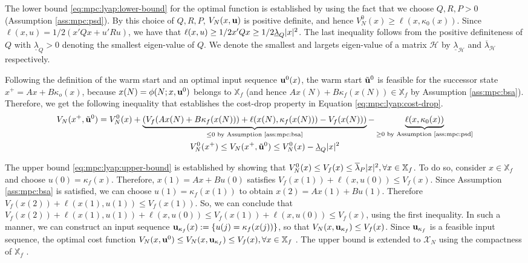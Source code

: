 The lower bound  \eqref{eq:mpc:lyap:lower-bound} for the optimal
function is established by using the 
fact that we choose $Q,R,P>0$ (Assumption \ref{ass:mpc:psd}). By this choice of $Q,R,P$, $V_N(x,\mathbf{u})$
is positive definite, and hence $V_N^0(x) \geq
\ell(x,\kappa_0(x))$. Since $\ell(x,u) = 1/2(x'Qx+u'Ru)$, we have that
$\ell(x,u) \geq 1/2x'Qx \geq 1/2\underline{\lambda}_Q\vert x \vert^2$. The last
inequality follows from the positive definiteness of $Q$ with
$\underline{\lambda}_Q >0$ denoting the smallest eigen-value of
$Q$. We denote the smallest and largets eigen-value of a matrix
$\mathcal{H}$ by $\underline{\lambda}_\mathcal{H}$ and
$\overline{\lambda}_{\mathcal{H}}$ respectively.

Following the definition of the warm start and an optimal input
sequence $\mathbf{u}^0(x)$, the warm start $\tilde{\mathbf{u}}^0$ is feasible for
the successor state $x^+ = Ax+B\kappa_o(x)$, because $x(N) = \phi(N;x,\mathbf{u}^0)$
belongs to $\mathbb{X}_f$ (and hence $Ax(N)+B\kappa_f(x(N)) \in
\mathbb{X}_f$ by Assumption \ref{ass:mpc:bsa}). Therefore, we get the
following inequality that establishes the cost-drop property in
Equation \eqref{eq:mpc:lyap:cost-drop}.
\begin{gather*}
V_N(x^+,\tilde{\mathbf{u}}^0) =
V_N^0(x)+\underbrace{\left(V_f(Ax(N)+B\kappa_f(x(N)))
+\ell(x(N),\kappa_f(x(N)))-V_f(x(N))\right)}_{\leq
  0 \text{~by Assumption \ref{ass:mpc:bsa}}} -
\underbrace{\ell(x,\kappa_0(x))}_{\geq 0 \text{~by Assumption
    \ref{ass:mpc:psd}}} \\
V_N^0(x^+) \leq V_N(x^+,\tilde{\mathbf{u}}^0)\leq  V_N^0(x)
 - \underline{\lambda}_{Q}\vert x \vert^2
\end{gather*}

The upper bound \eqref{eq:mpc:lyap:upper-bound} is established by
showing that $V_N^0(x) \leq V_f(x) 
\leq \overline{\lambda}_P\vert x \vert^2,
\forall x \in \mathbb{X}_f$. To do so, consider $x \in \mathbb{X}_f$
and choose $u(0) = \kappa_f(x)$. Therefore, $x(1) = Ax+Bu(0)$
satisfies $V_f(x(1))+\ell(x,u(0)) \leq V_f(x)$. Since Assumption
\ref{ass:mpc:bsa} is satisfied, we can choose $u(1) =
\kappa_f(x(1))$ to obtain $x(2) = Ax(1) + Bu(1)$. Therefore
$V_f(x(2))+\ell(x(1),u(1)) \leq V_f(x(1))$. So, we can conclude that
$V_f(x(2))+\ell(x(1),u(1))+\ell(x,u(0)) \leq V_f(x(1))+\ell(x,u(0))
\leq V_f(x)$, using the first inequality. In such a manner, we can
construct an input sequence $\mathbf{u}_{\kappa_f}(x) := \left\lbrace u(j) =
  \kappa_f(x(j)) \right\rbrace$, so 
that $V_N(x,\mathbf{u}_{\kappa_f}) \leq V_f(x)$. Since $\mathbf{u}_{\kappa_f}$ is a
feasible input sequence, the optimal cost function $V_N(x,\mathbf{u}^0) \leq
V_N(x,\mathbf{u}_{\kappa_f}) \leq V_f(x), \forall x \in \mathbb{X}_f$
\citep{pannocchia:rawlings:wright:2011}.  
The upper bound is extended to $\mathcal{X}_N$ using the
compactness of $\mathbb{X}_f$ \citep[Proposition 2.18]{rawlings:mayne:2009}. 

